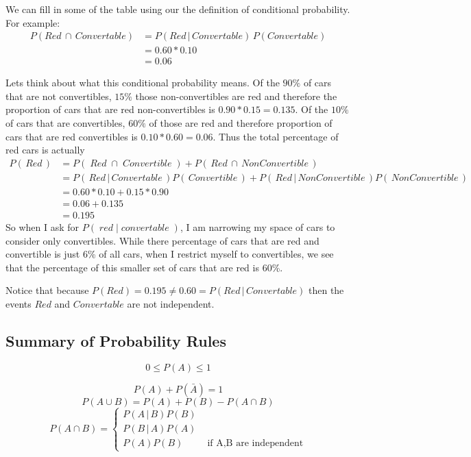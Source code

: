 \documentclass[]{book}
\begin{document}
We can fill in some of the table using our the definition of conditional
probability. For example: \[\begin{aligned}
P\left(Red\,\cap\,Convertable\right)    &= P\left(Red\,|\,Convertable\right)\,P\left(Convertable\right) \\
    &=  0.60*0.10 \\
    &=  0.06
  \end{aligned}\]

Lets think about what this conditional probability means. Of the
\(90\%\) of cars that are not convertibles, \(15\%\) those
non-convertibles are red and therefore the proportion of cars that are
red non-convertibles is \(0.90*0.15=0.135\). Of the \(10\%\) of cars
that are convertibles, \(60\%\) of those are red and therefore
proportion of cars that are red convertibles is \(0.10*0.60=0.06\). Thus
the total percentage of red cars is actually
\[\begin{aligned}P\left(\,Red\,\right)  
  &= P\left(\;Red\;\cap\;Convertible\;\right)+P\left(\,Red\,\cap\,NonConvertible\,\right)\\
    &= P\left(\,Red\,|\,Convertable\,\right)P\left(\,Convertible\,\right)+P\left(\,Red\,|\,NonConvertible\,\right)P\left(\,NonConvertible\,\right)\\
    &=  0.60*0.10+0.15*0.90\\
    &=  0.06+0.135\\
    &=  0.195
    \end{aligned}\] So when I ask for \(P(\;red\;|\;convertable\;)\), I
am narrowing my space of cars to consider only convertibles. While there
percentage of cars that are red and convertible is just 6\% of all cars,
when I restrict myself to convertibles, we see that the percentage of
this smaller set of cars that are red is 60\%.

Notice that because
\(P\left(Red\right)=0.195\ne0.60=P\left(Red\,|\,Convertable\right)\)
then the events \(Red\) and \(Convertable\) are not independent.

\subsection{Summary of Probability
Rules}\label{summary-of-probability-rules}

\[0 \le P\left(A\right) \le 1\]

\[P\left(A\right)+P\left(\bar{A}\right)=1\]
\[P\left(A\cup B\right) =   P\left(A\right)+P\left(B\right)-P\left(A\cap B\right)\]
\[P\left(A\cap B\right) =   \begin{cases}
P\left(A\,|\,B\right)P\left(B\right)\\
P\left(B\,|\,A\right)P\left(A\right)\\
P(A)P(B)\;\; & \textrm{ if A,B are independent}
\end{cases}\]
\end{document}
